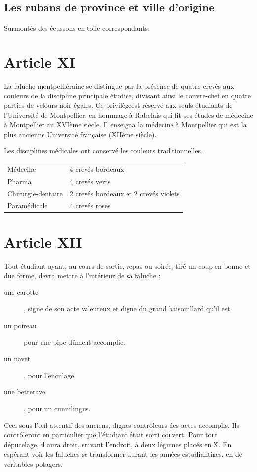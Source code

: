 \subsection{Les rubans de province et ville d'origine}
Surmontés des écussons en toile correspondants.


\section{Article XI}
         La faluche montpelliéraine se distingue par la présence de quatre crevés aux
couleurs de la discipline principale étudiée, divisant ainsi le couvre-chef en quatre parties
de velours noir égales. Ce \og privilège\fg est réservé aux seuls étudiants de l'Université de
Montpellier, en hommage à Rabelais qui fit ses études de médecine à Montpellier au
XVIème siècle. Il enseigna la médecine à Montpellier qui est la plus ancienne Université
française (XIIème siècle).

Les disciplines médicales ont conservé les couleurs traditionnelles.
\begin{center}
\begin{tabularx}{\textwidth}{l X}
   Médecine           & 4 crevés bordeaux \\
   Pharma             & 4 crevés verts\\
   Chirurgie-dentaire & 2 crevés bordeaux et 2 crevés violets\\
   Paramédicale       & 4 crevés roses\\
\end{tabularx}
\end{center}


\section{Article XII}
 Tout étudiant ayant, au cours de sortie, repas ou soirée, tiré un coup en bonne et
due forme, devra mettre à l'intérieur de sa faluche :
\begin{description}
      \item  [une carotte], signe de son acte valeureux et digne du grand baisouillard qu'il est.
      \item [un poireau] pour une pipe dûment accomplie.
      \item [un navet], pour l'enculage.
      \item [une betterave], pour un cunnilingus.
 \end{description}

 Ceci sous l'\oe il attentif des anciens, dignes contrôleurs des actes accomplis. Ils
contrôleront en particulier que l'étudiant était sorti couvert.
 Pour tout dépucelage, il aura droit, suivant l'endroit, à deux légumes placés en X.
 En espérant voir les faluches se transformer durant les années estudiantines, en de
véritables potagers.

